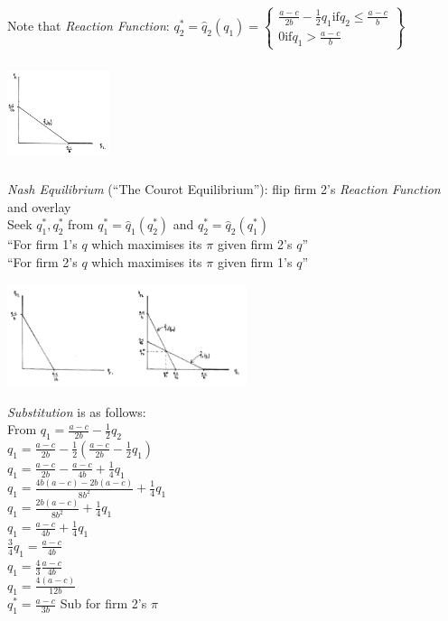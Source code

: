 \documentclass[11pt, english]{article}
\begin{document}
	Note that \textit{Reaction Function}: $q_2^*=\hat{q}_2(q_1)=\begin{Bmatrix}\frac{a-c}{2b}-\frac{1}{2}q_1\mathrm{if}q_2\le\frac{a-c}{b}\\0\mathrm{if}q_1>\frac{a-c}{b}\end{Bmatrix}$
	
	\begin{center}
                \includegraphics[width=3cm,height=3cm]{EC315-IMG/17.png}
        \end{center}

	\textit{Nash Equilibrium} (``The Courot Equilibrium''): flip firm 2's \textit{Reaction Function} and overlay\\
	Seek $q_1^*,q_2^*$ from $q_1^*=\hat{q}_1(q_2^*)$ and $q_2^*=\hat{q}_2(q_1^*)$\\
	``For firm 1's $q$ which maximises its $\pi$ given firm 2's $q$''\\
	``For firm 2's $q$ which maximises its $\pi$ given firm 1's $q$''

	\begin{center}
                \includegraphics[width=7cm,height=3cm]{EC315-IMG/18.png}
        \end{center}

	\textit{Substitution} is as follows:\\
	From $q_1=\frac{a-c}{2b}-\frac{1}{2}q_2$\\
	$q_1=\frac{a-c}{2b}-\frac{1}{2}(\frac{a-c}{2b}-\frac{1}{2}q_1)$\\
	$q_1=\frac{a-c}{2b}-\frac{a-c}{4b}+\frac{1}{4}q_1$\\
	$q_1=\frac{4b\left(a-c\right)-2b(a-c)}{8b^2}+\frac{1}{4}q_1$\\
	$q_1=\frac{2b\left(a-c\right)}{8b^2}+\frac{1}{4}q_1$\\
	$q_1=\frac{a-c}{4b}+\frac{1}{4}q_1$\\
	${\frac{3}{4}q}_1=\frac{a-c}{4b}$\\
	$q_1=\frac{4}{3}\frac{a-c}{4b}$\\
	$q_1=\frac{4(a-c)}{12b}$\\
	$q_1^*=\frac{a-c}{3b}$
	Sub for firm 2's $\pi$
\end{document}
